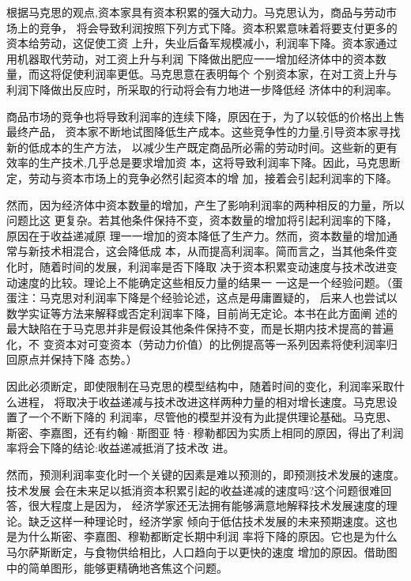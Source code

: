 根据马克思的观点,资本家具有资本积累的强大动力。马克思认为，商品与劳动市场上的竞争，
将会导致利润按照下列方式下降。资本积累意味着将要支付更多的资本给劳动，这促使工资
上升，失业后备军规模减小，利润率下降。资本家通过用机器取代劳动，对工资上升与利润
下降做出肥应一一增加经济体中的资本数量，而这将促使利润率更低。马克思意在表明每个
个别资本家，在对工资上升与利润下降做出反应时，所采取的行动将会有力地进一步降低经
济体中的利润率。

商品市场的竞争也将导致利润率的连续下降，原因在于，为了以较低的价格出上售最终产品，
资本家不断地试图降低生产成本。这些竞争性的力量,引导资本家寻找新的低成本的生产方法，
以减少生产既定商品所必需的劳动时间。这些新的更有效率的生产技术,几乎总是要求增加资
本，这将导致利润率下降。因此，马克思断定，劳动与资本市场上的竞争必然引起资本的增
加，接着会引起利润率的下降。

然而，因为经济体中资本数量的增加，产生了影响利润率的两种相反的力量，所以问题比这
更复杂。若其他条件保持不变，资本数量的增加将引起利润率的下降，原因在于收益递减原
理一一增加的资本降低了生产力。然而，资本数量的增加通常与新技术相混合，这会降低成
本，从而提高利润率。简而言之，当其他条件变化时，随着时间的发展，利润率是否下降取
决于资本积累变动速度与技术改进变动速度的比较。理论上不能确定这些相反力量的结果一
一这是一个经验问题。（蛋蛋注：马克思对利润率下降是个经验论述，这点是毋庸置疑的，
后来人也尝试以数学实证等方法来解释或否定利润率下降，目前尚无定论。本书在此方面阐
述的最大缺陷在于马克思并非是假设其他条件保持不变，而是长期内技术提高的普遍化，不
变资本对可变资本（劳动力价值）的比例提高等一系列因素将使利润率归回原点并保持下降
态势。）

因此必须断定，即使限制在马克思的模型结构中，随着时间的变化，利润率采取什么进程，
将取决于收益递减与技术改进这样两种力量的相对增长速度。马克思设置了一个不断下降的
利润率，尽管他的模型并没有为此提供理论基础。马克思、斯密、李嘉图，还有约翰·斯图亚
特·穆勒都因为实质上相同的原因，得出了利润率将会下降的结论:收益递减抵消了技术改
进。

然而，预测利润率变化时一个关键的因素是难以预测的，即预测技术发展的速度。技术发展
会在未来足以抵消资本积累引起的收益递减的速度吗?这个问题很难回答，很大程度上是因为，
经济学家还无法拥有能够满意地解释技术发展速度的理论。缺乏这样一种理论时，经济学家
倾向于低估技术发展的未来预期速度。这也是为什么斯密、李嘉图、穆勒都断定长期中利润
率将下降的原因。它也是为什么马尔萨斯断定，与食物供给相比，人口趋向于以更快的速度
增加的原因。借助图中的简单图形，能够更精确地吝焦这个问题。

